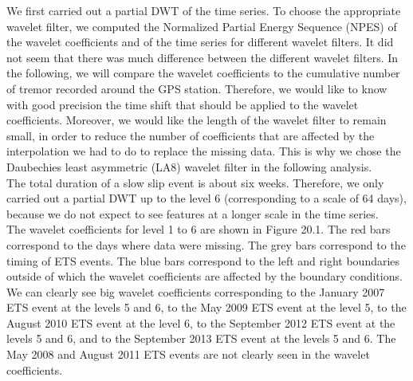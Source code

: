 \documentclass[main.tex]{subfiles}
\begin{document}
We first carried out a partial DWT of the time series. To choose the appropriate wavelet filter, we computed the Normalized Partial Energy Sequence (NPES) of the wavelet coefficients and of the time series for different wavelet filters. It did not seem that there was much difference between the different wavelet filters. In the following, we will compare the wavelet coefficients to the cumulative number of tremor recorded around the GPS station. Therefore, we would like to know with good precision the time shift that should be applied to the wavelet coefficients. Moreover, we would like the length of the wavelet filter to remain small, in order to reduce the number of coefficients that are affected by the interpolation we had to do to replace the missing data. This is why we chose the Daubechies least asymmetric (LA8) wavelet filter in the following analysis. \\

The total duration of a slow slip event is about six weeks. Therefore, we only carried out a partial DWT up to the level 6 (corresponding to a scale of 64 days), because we do not expect to see features at a longer scale in the time series. \\

The wavelet coefficients for level 1 to 6 are shown in Figure 20.1. The red bars correspond to the days where data were missing. The grey bars correspond to the timing of ETS events.  The blue bars correspond to the left and right boundaries outside of which the wavelet coefficients are affected by the boundary conditions. We can clearly see big wavelet coefficients corresponding to the January 2007 ETS event at the levels 5 and 6, to the May 2009 ETS event at the level 5, to the August 2010 ETS event at the level 6, to the September 2012 ETS event at the levels 5 and 6, and to the September 2013 ETS event at the levels 5 and 6.  The May 2008 and August 2011 ETS events are not clearly seen in the wavelet coefficients. \\
\end{document}
